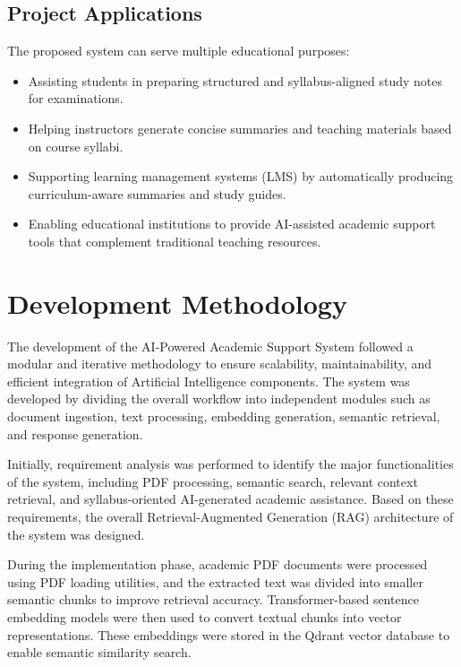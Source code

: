 \subsection{Project Applications}
The proposed system can serve multiple educational purposes:
\begin{itemize}
    \item Assisting students in preparing structured and syllabus-aligned study notes for examinations.
    \item Helping instructors generate concise summaries and teaching materials based on course syllabi.
    \item Supporting learning management systems (LMS) by automatically producing curriculum-aware summaries and study guides.
    \item Enabling educational institutions to provide AI-assisted academic support tools that complement traditional teaching resources.
\end{itemize}

\section{Development Methodology}
The development of the AI-Powered Academic Support System followed a modular and iterative methodology to ensure scalability, maintainability, and efficient integration of Artificial Intelligence components. The system was developed by dividing the overall workflow into independent modules such as document ingestion, text processing, embedding generation, semantic retrieval, and response generation. \par

Initially, requirement analysis was performed to identify the major functionalities of the system, including PDF processing, semantic search, relevant context retrieval, and syllabus-oriented AI-generated academic assistance. Based on these requirements, the overall Retrieval-Augmented Generation (RAG) architecture of the system was designed. \par

During the implementation phase, academic PDF documents were processed using PDF loading utilities, and the extracted text was divided into smaller semantic chunks to improve retrieval accuracy. Transformer-based sentence embedding models were then used to convert textual chunks into vector representations. These embeddings were stored in the Qdrant vector database to enable semantic similarity search. \par

